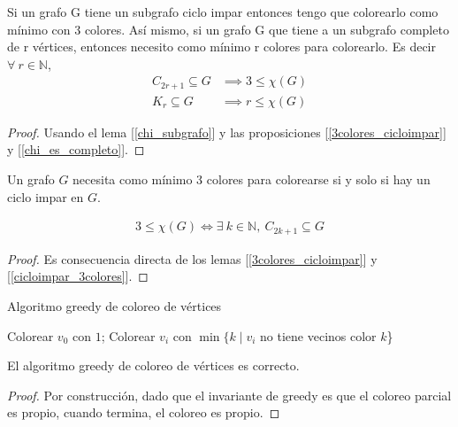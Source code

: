 \begin{lemma}\label{cicloimpar_3colores}
Si un grafo G tiene un subgrafo ciclo impar entonces tengo que colorearlo como mínimo con 3 colores.
Así mismo, si un grafo G que tiene a un subgrafo completo de r vértices, entonces necesito como mínimo r colores para colorearlo. Es decir $\forall~ r \in \mathbb{N}$,
\begin{align}
        C_{2r+1} \subseteq G &\implies 3 \le \chi(G) \\
        K_r \subseteq G      &\implies r \le \chi(G)
\end{align}
\end{lemma}
\begin{proof}
Usando el lema [\ref{chi_subgrafo}] y las proposiciones [\ref{3colores_cicloimpar}] y [\ref{chi_es_completo}].
\end{proof}

\begin{proposition}
 Un grafo $G$ necesita como mínimo 3 colores para colorearse si y solo si hay un ciclo impar en $G$.

\begin{align}
    3 \le \chi(G) \iff \exists~ k \in \mathbb{N},~ C_{2k+1} \subseteq G
\end{align}
\end{proposition}

\begin{proof}
Es consecuencia directa de los lemas [\ref{3colores_cicloimpar}] y [\ref{cicloimpar_3colores}].
\end{proof}


\begin{algorithm}
\caption{Algoritmo greedy de coloreo de vértices}
\begin{algorithmic}
    \State Colorear $v_0$ con $1$;
    \State Colorear $v_i$ con $\min \{k \mid v_i $ no tiene vecinos color $k$\}
    \EndFor
\EndFunction
\end{algorithmic}
\end{algorithm}

\begin{proposition}
El algoritmo greedy de coloreo de vértices es correcto.
\end{proposition}
\begin{proof}
Por construcción, dado que el invariante de greedy es que el coloreo parcial es propio, cuando termina, el coloreo es propio.
\end{proof}

